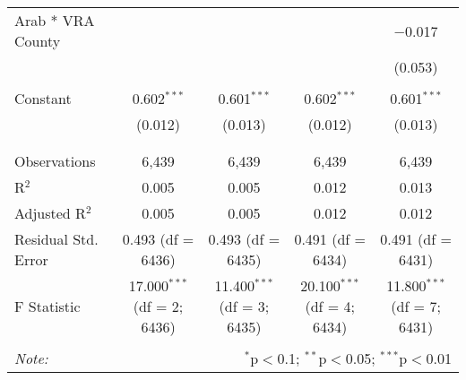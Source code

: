 \begin{table}[!htbp]
\begin{tabular}{@{\extracolsep{5pt}}lcccc}
 Arab * VRA County &  &  &  & $-$0.017 \\ 
  &  &  &  & (0.053) \\ 
  & & & & \\ 
 Constant & 0.602$^{***}$ & 0.601$^{***}$ & 0.602$^{***}$ & 0.601$^{***}$ \\ 
  & (0.012) & (0.013) & (0.012) & (0.013) \\ 
  & & & & \\ 
\hline \\[-1.8ex] 
Observations & 6,439 & 6,439 & 6,439 & 6,439 \\ 
R$^{2}$ & 0.005 & 0.005 & 0.012 & 0.013 \\ 
Adjusted R$^{2}$ & 0.005 & 0.005 & 0.012 & 0.012 \\ 
Residual Std. Error & 0.493 (df = 6436) & 0.493 (df = 6435) & 0.491 (df = 6434) & 0.491 (df = 6431) \\ 
F Statistic & 17.000$^{***}$ (df = 2; 6436) & 11.400$^{***}$ (df = 3; 6435) & 20.100$^{***}$ (df = 4; 6434) & 11.800$^{***}$ (df = 7; 6431) \\ 
\hline 
\hline \\[-1.8ex] 
\textit{Note:}  & \multicolumn{4}{r}{$^{*}$p$<$0.1; $^{**}$p$<$0.05; $^{***}$p$<$0.01} \\ 
\end{tabular} 
\end{table} 
